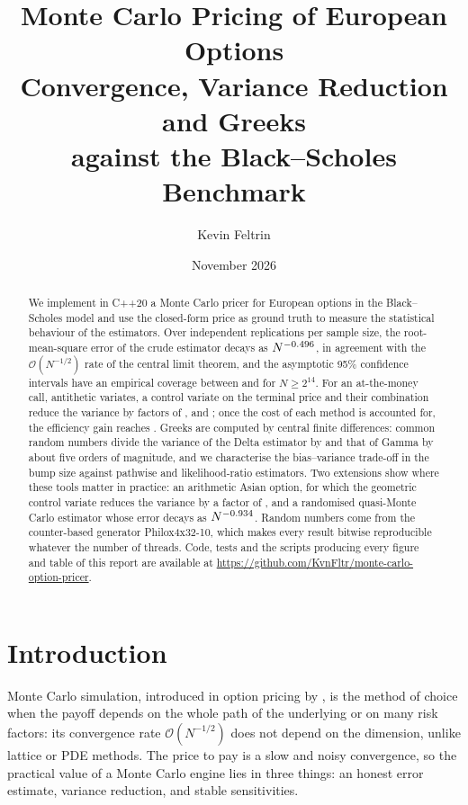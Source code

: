 \documentclass[11pt,a4paper]{article}
\title{\textbf{Monte Carlo Pricing of European Options}\\[4pt]
  \large Convergence, Variance Reduction and Greeks\\ against the Black--Scholes Benchmark}
\author{Kevin Feltrin}
\date{November 2026}
\newcommand{\1}{\mathbf{1}}
\newcommand{\repo}{\url{https://github.com/KvnFltr/monte-carlo-option-pricer}}
\theoremstyle{plain}
\theoremstyle{remark}
\begin{document}
\maketitle

\begin{abstract}
\noindent
We implement in C++20 a Monte Carlo pricer for European options in the Black--Scholes model and use the
closed-form price as ground truth to measure the statistical behaviour of the estimators. Over
\Replications{} independent replications per sample size, the root-mean-square error of the crude
estimator decays as $N^{-0.496}$, in agreement with the $\mathcal{O}(N^{-1/2})$ rate of the central limit
theorem, and the asymptotic 95\% confidence intervals have an empirical coverage between \CoverageMin{} and
\CoverageMax{} for $N \ge 2^{14}$. For an at-the-money call, antithetic variates, a control variate on the
terminal price and their combination reduce the variance by factors of \VRFAnti, \VRFCV{} and \VRFBoth;
once the cost of each method is accounted for, the efficiency gain reaches \EffBoth. Greeks are computed by
central finite differences: common random numbers divide the variance of the Delta estimator by
\DeltaCRNVarianceGain{} and that of Gamma by about five orders of magnitude, and we characterise the
bias--variance trade-off in the bump size against pathwise and likelihood-ratio estimators. Two extensions show
where these tools matter in practice: an arithmetic Asian option, for which the geometric control variate
reduces the variance by a factor of \AsianVRFCV, and a randomised quasi-Monte Carlo estimator whose error
decays as $N^{-0.934}$. Random numbers come from the counter-based generator Philox4x32-10, which makes
every result bitwise reproducible whatever the number of threads. Code, tests and the scripts producing every
figure and table of this report are available at \repo.
\end{abstract}

\tableofcontents
\bigskip

\section{Introduction}

Monte Carlo simulation, introduced in option pricing by \citet{boyle1977}, is the method of choice when the
payoff depends on the whole path of the underlying or on many risk factors: its convergence rate
$\mathcal{O}(N^{-1/2})$ does not depend on the dimension, unlike lattice or PDE methods. The price to pay is a
slow and noisy convergence, so the practical value of a Monte Carlo engine lies in three things: an honest
error estimate, variance reduction, and stable sensitivities.
\end{document}
